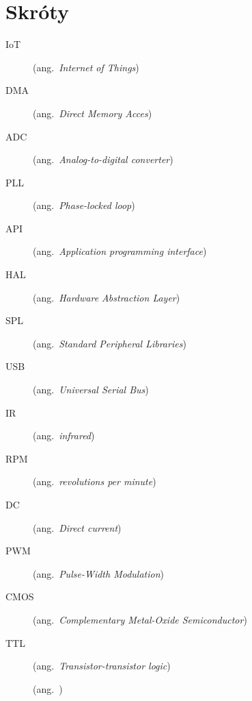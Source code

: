 \chapter*{Skróty}\mbox{}
\label{sec:skroty}
\noindent
\begin{description}
	\item [IoT] (ang.\ \emph{Internet of Things})
	\item [DMA] (ang.\ \emph{Direct Memory Acces})
	\item [ADC] (ang.\ \emph{Analog-to-digital converter})
	\item [PLL] (ang.\ \emph{Phase-locked loop})
	\item [API] (ang.\ \emph{Application programming interface})
	\item [HAL] (ang.\ \emph{Hardware Abstraction Layer})
	\item [SPL] (ang.\ \emph{Standard Peripheral Libraries})
	\item [USB] (ang.\ \emph{Universal Serial Bus})
	\item [IR] (ang.\ \emph{infrared})
	\item [RPM] (ang.\ \emph{revolutions per minute})
	\item [DC] (ang.\ \emph{Direct current})
	\item [PWM] (ang.\ \emph{Pulse-Width Modulation})
	\item [CMOS] (ang.\ \emph{Complementary Metal-Oxide Semiconductor})
	\item [TTL] (ang.\ \emph{Transistor-transistor logic})
	\item [] (ang.\ \emph{})
\end{description}
